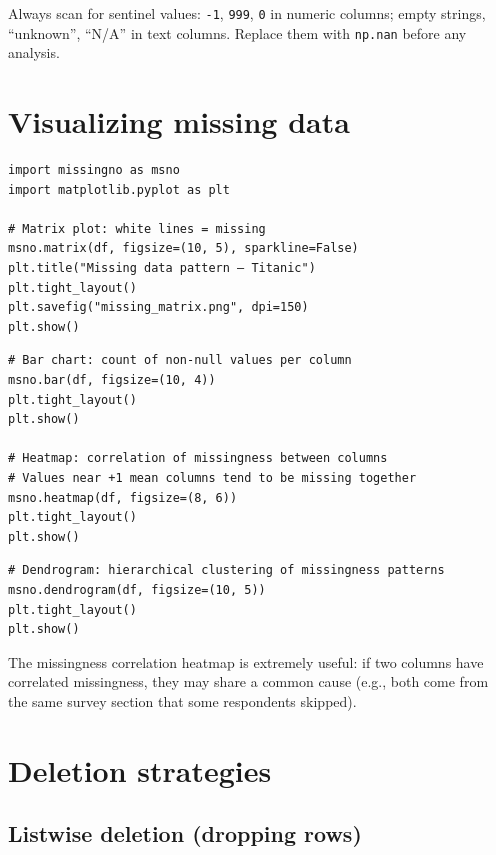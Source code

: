 \begin{datatip}
Always scan for sentinel values: \texttt{-1}, \texttt{999}, \texttt{0} in numeric columns; empty strings, ``unknown'', ``N/A'' in text columns. Replace them with \texttt{np.nan} before any analysis.
\end{datatip}

\section{Visualizing missing data}

\begin{verbatim}
import missingno as msno
import matplotlib.pyplot as plt

# Matrix plot: white lines = missing
msno.matrix(df, figsize=(10, 5), sparkline=False)
plt.title("Missing data pattern — Titanic")
plt.tight_layout()
plt.savefig("missing_matrix.png", dpi=150)
plt.show()
\end{verbatim}

\begin{verbatim}
# Bar chart: count of non-null values per column
msno.bar(df, figsize=(10, 4))
plt.tight_layout()
plt.show()

# Heatmap: correlation of missingness between columns
# Values near +1 mean columns tend to be missing together
msno.heatmap(df, figsize=(8, 6))
plt.tight_layout()
plt.show()
\end{verbatim}

\begin{verbatim}
# Dendrogram: hierarchical clustering of missingness patterns
msno.dendrogram(df, figsize=(10, 5))
plt.tight_layout()
plt.show()
\end{verbatim}

\begin{preprocesstip}
The missingness correlation heatmap is extremely useful: if two columns have correlated missingness, they may share a common cause (e.g., both come from the same survey section that some respondents skipped).
\end{preprocesstip}

\section{Deletion strategies}

\subsection{Listwise deletion (dropping rows)}

